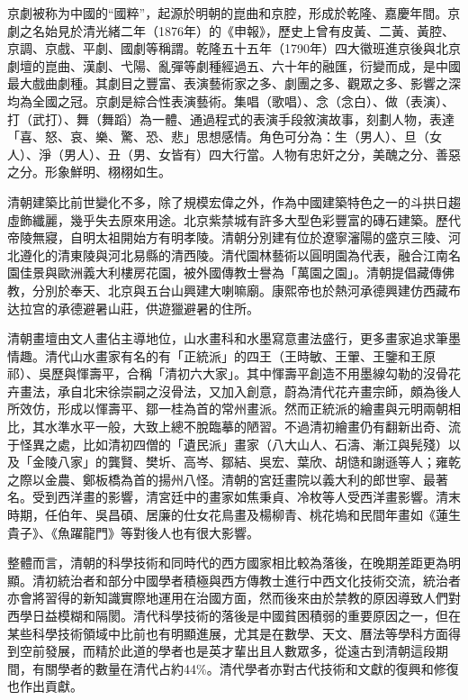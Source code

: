 京劇被称为中國的“國粹”，起源於明朝的崑曲和京腔，形成於乾隆、嘉慶年間。京劇之名始見於清光緒二年（1876年）的《申報》，歷史上曾有皮黃、二黃、黃腔、京調、京戲、平劇、國劇等稱謂。乾隆五十五年（1790年）四大徽班進京後與北京劇壇的崑曲、漢劇、弋陽、亂彈等劇種經過五、六十年的融匯，衍變而成，是中國最大戲曲劇種。其劇目之豐富、表演藝術家之多、劇團之多、觀眾之多、影響之深均為全國之冠。京劇是綜合性表演藝術。集唱（歌唱）、念（念白）、做（表演）、打（武打）、舞（舞蹈）為一體、通過程式的表演手段敘演故事，刻劃人物，表達「喜、怒、哀、樂、驚、恐、悲」思想感情。角色可分為：生（男人）、旦（女人）、淨（男人）、丑（男、女皆有）四大行當。人物有忠奸之分，美醜之分、善惡之分。形象鮮明、栩栩如生。

清朝建築比前世變化不多，除了規模宏偉之外，作為中國建築特色之一的斗拱日趨虛飾纖麗，幾乎失去原來用途。北京紫禁城有許多大型色彩豐富的磚石建築。歷代帝陵無寢，自明太祖開始方有明孝陵。清朝分別建有位於遼寧瀋陽的盛京三陵、河北遵化的清東陵與河北易縣的清西陵。清代園林藝術以圓明園為代表，融合江南名園佳景與歐洲義大利樓房花園，被外國傳教士譽為「萬園之園」。清朝提倡藏傳佛教，分別於奉天、北京與五台山興建大喇嘛廟。康熙帝也於熱河承德興建仿西藏布达拉宫的承德避暑山莊，供遊獵避暑的住所。

清朝畫壇由文人畫佔主導地位，山水畫科和水墨寫意畫法盛行，更多畫家追求筆墨情趣。清代山水畫家有名的有「正統派」的四王（王時敏、王翬、王鑒和王原祁）、吳歷與惲壽平，合稱「清初六大家」。其中惲壽平創造不用墨線勾勒的沒骨花卉畫法，承自北宋徐崇嗣之沒骨法，又加入創意，蔚為清代花卉畫宗師，頗為後人所效仿，形成以惲壽平、鄒一桂為首的常州畫派。然而正統派的繪畫與元明兩朝相比，其水準水平一般，大致上總不脫臨摹的陋習。不過清初繪畫仍有翻新出奇、流于怪異之處，比如清初四僧的「遺民派」畫家（八大山人、石濤、漸江與髡殘）以及「金陵八家」的龔賢、樊圻、高岑、鄒結、吳宏、葉欣、胡慥和謝遜等人；雍乾之際以金農、鄭板橋為首的揚州八怪。清朝的宮廷畫院以義大利的郎世寧、最著名。受到西洋畫的影響，清宮廷中的畫家如焦秉貞、冷枚等人受西洋畫影響。清末時期，任伯年、吳昌碩、居廉的仕女花鳥畫及楊柳青、桃花塢和民間年畫如《蓮生貴子》、《魚躍龍門》等對後人也有很大影響。

整體而言，清朝的科學技術和同時代的西方國家相比較為落後，在晚期差距更為明顯。清初統治者和部分中國學者積極與西方傳教士進行中西文化技術交流，統治者亦會將習得的新知識實際地運用在治國方面，然而後來由於禁教的原因導致人們對西學日益模糊和隔閡。清代科學技術的落後是中國貧困積弱的重要原因之一，但在某些科學技術領域中比前也有明顯進展，尤其是在數學、天文、曆法等學科方面得到空前發展，而精於此道的學者也是英才輩出且人數眾多，從遠古到清朝這段期間，有關學者的數量在清代占約44\%。清代學者亦對古代技術和文獻的復興和修復也作出貢獻。

